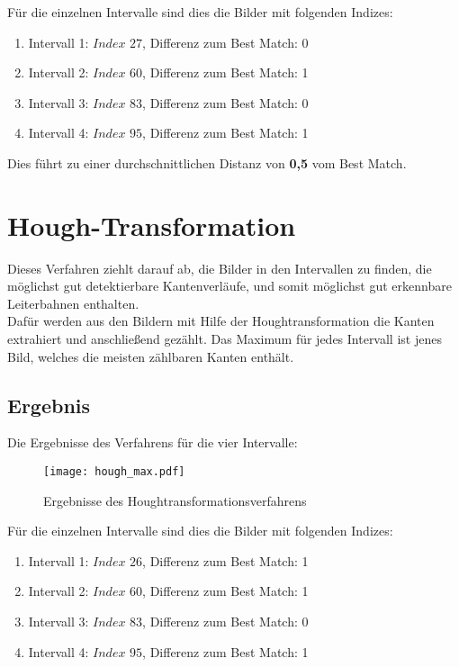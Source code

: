 Für die einzelnen Intervalle sind dies die Bilder mit folgenden Indizes:
\begin{enumerate}
	\item{Intervall 1: $Index$ $27$, Differenz zum Best Match: 0}
	\item{Intervall 2: $Index$ $60$, Differenz zum Best Match: 1}
	\item{Intervall 3: $Index$ $83$, Differenz zum Best Match: 0}
	\item{Intervall 4: $Index$ $95$, Differenz zum Best Match: 1}
\end{enumerate}

Dies führt zu einer durchschnittlichen Distanz von \textbf{0,5} vom Best Match.


\section{Hough-Transformation}
Dieses Verfahren ziehlt darauf ab, die Bilder in den Intervallen zu finden, die möglichst gut detektierbare Kantenverläufe, und somit möglichst gut erkennbare Leiterbahnen enthalten. \\
Dafür werden aus den Bildern mit Hilfe der Houghtransformation die Kanten extrahiert und anschließend gezählt. Das Maximum für jedes Intervall ist jenes Bild, welches die meisten zählbaren Kanten enthält.

\subsection{Ergebnis} 

Die Ergebnisse des Verfahrens für die vier Intervalle:
\begin{figure}[H]
  \begin{center}
    \texttt{[image: hough\_max.pdf]}
    \caption{Ergebnisse des Houghtransformationsverfahrens}
    \label{fig:hough_bestmatch4}
  \end{center}
\end{figure}

Für die einzelnen Intervalle sind dies die Bilder mit folgenden Indizes:
\begin{enumerate}
	\item{Intervall 1: $Index$ $26$, Differenz zum Best Match: 1}
	\item{Intervall 2: $Index$ $60$, Differenz zum Best Match: 1}
	\item{Intervall 3: $Index$ $83$, Differenz zum Best Match: 0}
	\item{Intervall 4: $Index$ $95$, Differenz zum Best Match: 1}
\end{enumerate}

